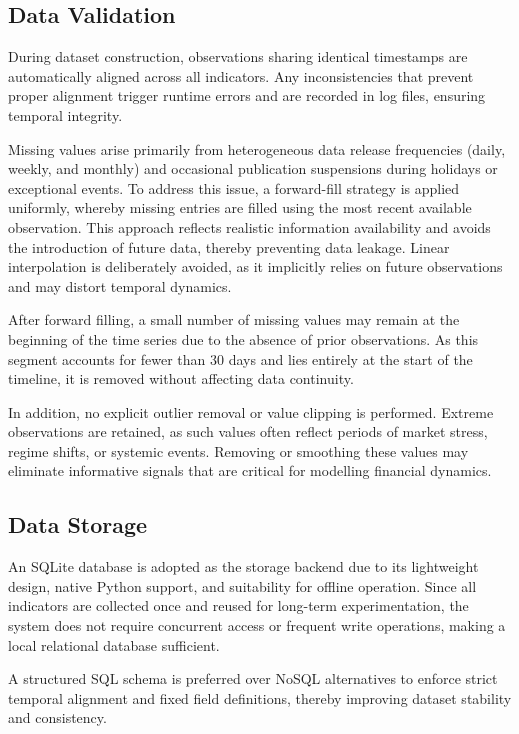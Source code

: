 \documentclass[10pt]{article} %
\begin{document}
\subsection{Data Validation}

During dataset construction, observations sharing identical timestamps are automatically aligned across all indicators. Any inconsistencies that prevent proper alignment trigger runtime errors and are recorded in log files, ensuring temporal integrity.

Missing values arise primarily from heterogeneous data release frequencies (daily, weekly, and monthly) and occasional publication suspensions during holidays or exceptional events. To address this issue, a forward-fill strategy is applied uniformly, whereby missing entries are filled using the most recent available observation. This approach reflects realistic information availability and avoids the introduction of future data, thereby preventing data leakage. Linear interpolation is deliberately avoided, as it implicitly relies on future observations and may distort temporal dynamics.

After forward filling, a small number of missing values may remain at the beginning of the time series due to the absence of prior observations. As this segment accounts for fewer than 30 days and lies entirely at the start of the timeline, it is removed without affecting data continuity.

In addition, no explicit outlier removal or value clipping is performed. Extreme observations are retained, as such values often reflect periods of market stress, regime shifts, or systemic events. Removing or smoothing these values may eliminate informative signals that are critical for modelling financial dynamics.



\subsection{Data Storage}\label{sec:data_storage}

An SQLite database is adopted as the storage backend due to its lightweight design, native Python support, and suitability for offline operation. Since all indicators are collected once and reused for long-term experimentation, the system does not require concurrent access or frequent write operations, making a local relational database sufficient.

A structured SQL schema is preferred over NoSQL alternatives to enforce strict temporal alignment and fixed field definitions, thereby improving dataset stability and consistency.
\end{document}
